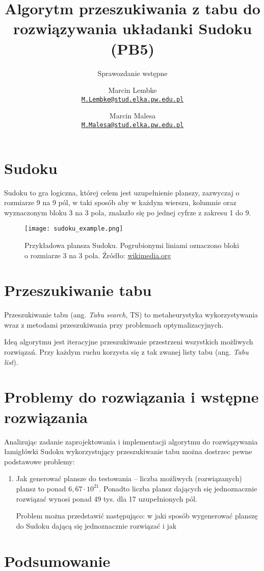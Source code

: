 \documentclass[]{../project_report}
\author{%
	Marcin Lembke\\
	\texttt{\href{mailto:M.Lembke@stud.elka.pw.edu.pl}%
			{\nolinkurl{M.Lembke@stud.elka.pw.edu.pl}}}
	\and
	Marcin Malesa\\
	\texttt{\href{mailto:M.Malesa@stud.elka.pw.edu.pl}%
			{\nolinkurl{M.Malesa@stud.elka.pw.edu.pl}}}
}
\title{Algorytm przeszukiwania z tabu do rozwiązywania układanki Sudoku (PB5)}
\subtitle{Sprawozdanie wstępne}
\begin{document}
	\maketitle
	\section{Sudoku}
	Sudoku to gra logiczna, której celem jest uzupełnienie planszy, zazwyczaj o rozmiarze 9 na 9 pól, w taki sposób aby w każdym wierszu, kolumnie oraz wyznaczonym bloku 3 na 3 pola, znalazło się po jednej cyfrze z zakresu 1 do 9.
	
	\begin{figure}[H]
		\centering
		\texttt{[image: sudoku\_example.png]}
		\caption{Przykładowa plansza Sudoku. Pogrubionymi liniami oznaczono bloki o rozmiarze 3 na 3 pola. Źródło: \href{https://upload.wikimedia.org/wikipedia/commons/2/2d/Sudoku_przyklad.png}{wikimedia.org}}
	\end{figure}
	
	\section{Przeszukiwanie tabu}
	Przeszukiwanie tabu (ang. \textit{Tabu search}, TS) to metaheurystyka wykorzystywania wraz z metodami przeszukiwania przy problemach optymalizacyjnych.
	
	Ideą algorytmu jest iteracyjne przeszukiwanie przestrzeni wszystkich możliwych rozwiązań. Przy każdym ruchu korzysta się z tak zwanej listy tabu (ang. \textit{Tabu list}).
	
	\section{Problemy do rozwiązania i wstępne rozwiązania}
	Analizując zadanie zaprojektowania i implementacji algorytmu do rozwiązywania łamigłówki Sudoku wykorzystujący przeszukiwanie tabu można dostrzec pewne podstawowe problemy:
	\begin{enumerate}
		\item Jak generować plansze do testowania -- liczba możliwych (rozwiązanych) plansz to ponad \(6,67 \cdot 10^{21}\). Ponadto liczba plansz dających się jednoznacznie rozwiązać wynosi ponad 49 tys. dla 17 uzupełnionych pól.
		
		Problem można przedstawić następująco: w jaki sposób wygenerować planszę do Sudoku dającą się jednoznacznie rozwiązać i jak
	\end{enumerate}
	\section{Podsumowanie}
\end{document}

